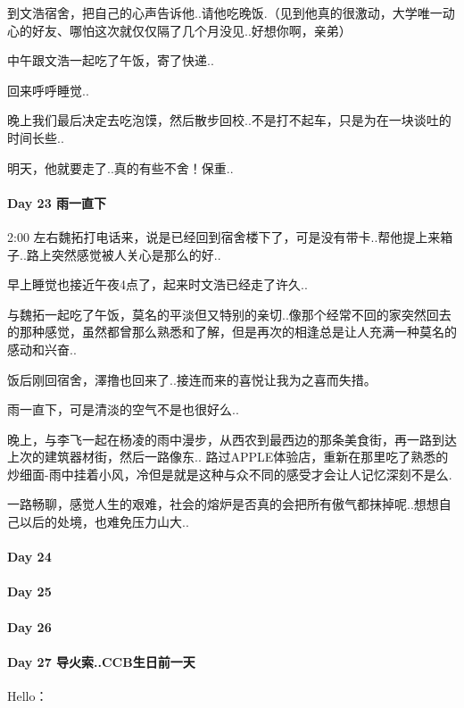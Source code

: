 \documentclass[UTF8,a4paper,8pt]{ctexbook}
\begin{document}
	 	 到文浩宿舍，把自己的心声告诉他..请他吃晚饭.（见到他真的很激动，大学唯一动心的好友、哪怕这次就仅仅隔了几个月没见..好想你啊，亲弟）
	 	 
	 	 中午跟文浩一起吃了午饭，寄了快递..
	 	 
	 	 回来呼呼睡觉..
	 	 
	 	 晚上我们最后决定去吃泡馍，然后散步回校..不是打不起车，只是为在一块谈吐的时间长些..
	 	 
	 	 明天，他就要走了..真的有些不舍！保重..
	 	 
 	 \paragraph{Day 23   雨一直下   \quad     }
	 	 2:00 左右魏拓打电话来，说是已经回到宿舍楼下了，可是没有带卡..帮他提上来箱子..路上突然感觉被人关心是那么的好..
	 	 
	 	 早上睡觉也接近午夜4点了，起来时文浩已经走了许久..
	 	 
	 	 与魏拓一起吃了午饭，莫名的平淡但又特别的亲切..像那个经常不回的家突然回去的那种感觉，虽然都曾那么熟悉和了解，但是再次的相逢总是让人充满一种莫名的感动和兴奋..
	 	 
	 	 饭后刚回宿舍，澤撸也回来了..接连而来的喜悦让我为之喜而失措。
	 	 
	 	 雨一直下，可是清淡的空气不是也很好么..
	 	 
	 	 晚上，与李飞一起在杨凌的雨中漫步，从西农到最西边的那条美食街，再一路到达上次的建筑器材街，然后一路像东..
	 	 路过APPLE体验店，重新在那里吃了熟悉的炒细面-雨中挂着小风，冷但是就是这种与众不同的感受才会让人记忆深刻不是么.
	 	 
	 	 一路畅聊，感觉人生的艰难，社会的熔炉是否真的会把所有傲气都抹掉呢..想想自己以后的处境，也难免压力山大..	 
 	 \paragraph{Day 24      \quad     }
 	 \paragraph{Day 25      \quad     }
 	 \paragraph{Day 26      \quad     }
 	 \paragraph{Day 27  导火索..CCB生日前一天    \quad     }
	 	 Hello： 
	 	 
\end{document}
